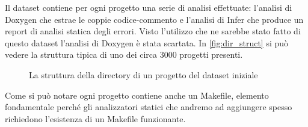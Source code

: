 Il dataset contiene per ogni progetto una serie di analisi effettuate: l'analisi di Doxygen che estrae le coppie codice-commento e l'analisi di Infer che produce un report di analisi statica degli errori.
Visto l'utilizzo che ne sarebbe stato fatto di questo dataset l'analisi di Doxygen è stata scartata. In \autoref{fig:dir_struct} si può vedere la struttura tipica di uno dei circa 3000 progetti presenti.
\begin{figure}
    \centering
    \caption{La struttura della directory di un progetto del dataset iniziale}
    \label{fig:dir_struct}
\end{figure}

Come si può notare ogni progetto contiene anche un Makefile, elemento fondamentale perché gli analizzatori statici che andremo ad aggiungere spesso richiedono l'esistenza di un Makefile funzionante.

